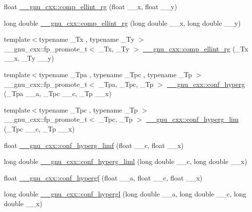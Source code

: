 \begin{DoxyCompactItemize}
float \hyperlink{group__mathsf__gnu_ga978f8eec6e5edc918b243925dbacb65b}{\+\_\+\+\_\+gnu\+\_\+cxx\+::comp\+\_\+ellint\+\_\+rg} (float \+\_\+\+\_\+x, float \+\_\+\+\_\+y)
\item 
long double \hyperlink{group__mathsf__gnu_gaca5fa8ee8125afc8f35ec6b27806e873}{\+\_\+\+\_\+gnu\+\_\+cxx\+::comp\+\_\+ellint\+\_\+rg} (long double \+\_\+\+\_\+x, long double \+\_\+\+\_\+y)
\item 
{\footnotesize template$<$typename \+\_\+\+Tx , typename \+\_\+\+Ty $>$ }\\\+\_\+\+\_\+gnu\+\_\+cxx\+::fp\+\_\+promote\+\_\+t$<$ \+\_\+\+Tx, \+\_\+\+Ty $>$ \hyperlink{group__mathsf__gnu_ga389b1ef6cad1e33c1120665a4b915642}{\+\_\+\+\_\+gnu\+\_\+cxx\+::comp\+\_\+ellint\+\_\+rg} (\+\_\+\+Tx \+\_\+\+\_\+x, \+\_\+\+Ty \+\_\+\+\_\+y)
\item 
{\footnotesize template$<$typename \+\_\+\+Tpa , typename \+\_\+\+Tpc , typename \+\_\+\+Tp $>$ }\\\+\_\+\+\_\+gnu\+\_\+cxx\+::fp\+\_\+promote\+\_\+t$<$ \+\_\+\+Tpa, \+\_\+\+Tpc, \+\_\+\+Tp $>$ \hyperlink{group__mathsf__gnu_ga4d01e85e7d295afca5d9f8b6c68f19cc}{\+\_\+\+\_\+gnu\+\_\+cxx\+::conf\+\_\+hyperg} (\+\_\+\+Tpa \+\_\+\+\_\+a, \+\_\+\+Tpc \+\_\+\+\_\+c, \+\_\+\+Tp \+\_\+\+\_\+x)
\item 
{\footnotesize template$<$typename \+\_\+\+Tpc , typename \+\_\+\+Tp $>$ }\\\+\_\+\+\_\+gnu\+\_\+cxx\+::fp\+\_\+promote\+\_\+t$<$ \+\_\+\+Tpc, \+\_\+\+Tp $>$ \hyperlink{group__mathsf__gnu_ga9fe7a5e2e741f56d88fd29bc249feab2}{\+\_\+\+\_\+gnu\+\_\+cxx\+::conf\+\_\+hyperg\+\_\+lim} (\+\_\+\+Tpc \+\_\+\+\_\+c, \+\_\+\+Tp \+\_\+\+\_\+x)
\item 
float \hyperlink{group__mathsf__gnu_ga609879a370bc4e9fc70563806bc49cb9}{\+\_\+\+\_\+gnu\+\_\+cxx\+::conf\+\_\+hyperg\+\_\+limf} (float \+\_\+\+\_\+c, float \+\_\+\+\_\+x)
\item 
long double \hyperlink{group__mathsf__gnu_ga367be9b77eb1f9ccc2971d5300da48d1}{\+\_\+\+\_\+gnu\+\_\+cxx\+::conf\+\_\+hyperg\+\_\+liml} (long double \+\_\+\+\_\+c, long double \+\_\+\+\_\+x)
\item 
float \hyperlink{group__mathsf__gnu_gabd18e600aa78c3f2b2f835039506c810}{\+\_\+\+\_\+gnu\+\_\+cxx\+::conf\+\_\+hypergf} (float \+\_\+\+\_\+a, float \+\_\+\+\_\+c, float \+\_\+\+\_\+x)
\item 
long double \hyperlink{group__mathsf__gnu_ga0a9853f30d8fa515a12cd45a92da832e}{\+\_\+\+\_\+gnu\+\_\+cxx\+::conf\+\_\+hypergl} (long double \+\_\+\+\_\+a, long double \+\_\+\+\_\+c, long double \+\_\+\+\_\+x)

\end{DoxyCompactItemize}

